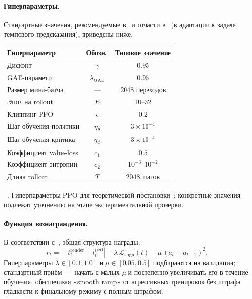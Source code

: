 \paragraph*{Гиперпараметры.} Стандартные значения,
рекомендуемые в~\cite{Schulman2017PPO} и отчасти в~\cite{Dorfer2018RL}
(в адаптации к задаче темпового предсказания), приведены ниже.

\par\addvspace{2pt}
{\centering
{}%
\footnotesize
\begin{tabular}{@{}lcc@{}}
  \toprule
  Гиперпараметр & Обозн.\,           & Типовое значение \\
  \midrule
  Дисконт & $\gamma$ & $0.95$ \\
  GAE-параметр & $\lambda_{\text{GAE}}$ & $0.95$ \\
  Размер мини-батча & --- & $2048$ переходов \\
  Эпох на rollout & $E$ & $10$--$32$ \\
  Клиппинг PPO & $\epsilon$ & $0.2$ \\
  Шаг обучения политики & $\eta_\theta$ & $3\!\times\!10^{-4}$ \\
  Шаг обучения критика & $\eta_\phi$ & $3\!\times\!10^{-4}$ \\
  Коэффициент value-loss & $c_1$ & $0.5$ \\
  Коэффициент энтропии & $c_2$ & $10^{-3}$--$10^{-2}$ \\
  Длина rollout & $T$ & $2048$ шагов \\
  \bottomrule
\end{tabular}\par
\vspace{2pt}
\tablename~\thetable. Гиперпараметры PPO для теоретической
постановки~; конкретные значения подлежат
уточнению на этапе экспериментальной проверки.\par}
\addvspace{4pt}

\paragraph*{Функция вознаграждения.} В соответствии
с~, общая структура награды:
\[
r_t = -|t^{\text{render}}_t - t^{\text{perf}}_t|
- \lambda\,\mathcal{L}_{\text{align}}(t)
- \mu\,(a_t - a_{t-1})^2.
\]
Гиперпараметры $\lambda\in[0.1,1.0]$ и $\mu\in[0.05, 0.5]$
подбираются на валидации; стандартный приём~--- начать с
малых $\mu$ и постепенно увеличивать его в течение
обучения, обеспечивая «smooth ramp» от агрессивных
тренировок без штрафа гладкости к финальному режиму с
полным штрафом.


